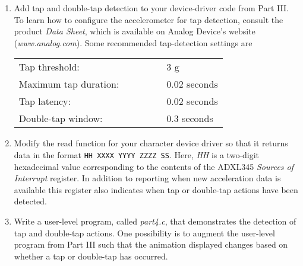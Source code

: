 \documentclass[epsfig,10pt,fullpage]{article}
\newcommand{\CommonDocsPath}{../../common/docs}
\begin{document}
\begin{enumerate}
\item Add tap and double-tap detection to your device-driver code from Part III. To learn
how to configure the accelerometer for tap detection, consult the product {\it Data Sheet},
which is available on Analog Device's website ({\it www.analog.com}). Some recommended 
tap-detection settings are

\begin{tabular}{ l l }
	\\Tap threshold:& ~~~~~~~~3 g \\
	Maximum tap duration:& ~~~~~~~~0.02 seconds\\
	Tap latency:& ~~~~~~~~0.02 seconds \\
	Double-tap window:& ~~~~~~~~0.3 seconds\\
\end{tabular}

\item Modify the read function for your character device driver so that it returns data in
the format \texttt{HH XXXX YYYY ZZZZ SS}. Here, {\it HH} is a two-digit hexadecimal value
corresponding to the contents of the ADXL345 {\it Sources of Interrupt} register. In addition to
reporting when new acceleration data is available this register also indicates when tap
or double-tap actions have been detected.
\item Write a user-level program, called {\it part4.c}, that demonstrates the detection of 
tap and double-tap actions. One possibility is to augment the user-level program from Part III
such that the animation displayed changes based on whether a tap or double-tap has occurred.
\end{enumerate}

\vskip 0.8in
\noindent
\newpage

\end{document}
